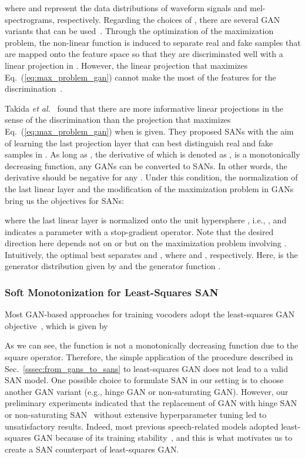 \documentclass{article}
\def\beqref#1{(\ref{#1})}
\begin{document}
where  and  represent the data distributions of waveform signals and mel-spectrograms, respectively.
Regarding the choices of  , there are several GAN variants that can be used~\cite{goodfellow2014generative,sebastian2016f,arjovsky2017wasserstein}.
Through the optimization of the maximization problem, the non-linear function  is induced to separate real and fake samples that are mapped onto the feature space  so that they are discriminated well with a linear projection in . However, the linear projection  that maximizes Eq.~\beqref{eq:max_problem_gan} cannot make the most of the features for the discrimination~\cite{takida2023san}.

Takida \textit{et al.}~\cite{takida2023san} found that there are more informative linear projections in the sense of the discrimination than the projection  that maximizes Eq.~\beqref{eq:max_problem_gan} when  is given. They proposed SANs with the aim of learning the last projection layer that can best distinguish real and fake samples in . As long as , the derivative of which is denoted as , is a monotonically decreasing function, any GANs can be converted to SANs. In other words, the derivative  should be negative for any . Under this condition, the normalization of the last linear layer and the modification of the maximization problem in GANs bring us the objectives for SANs:

where the last linear layer is normalized onto the unit hypersphere , i.e., , and  indicates a parameter with a stop-gradient operator.
Note that the desired direction here depends not on  or  but on the maximization problem involving . Intuitively, the optimal  best separates  and , where  and , respectively. Here,  is the generator distribution given by  and the generator function .

\subsubsection{Soft Monotonization for Least-Squares SAN}
\label{sssec:least_square_san}

Most GAN-based approaches for training vocoders adopt the least-squares GAN objective~\cite{mao2017least}, which is given by

As we can see, the function  is not a monotonically decreasing function due to the square operator. Therefore, the simple application of the procedure described in Sec.~\ref{sssec:from_gans_to_sans} to least-squares GAN does not lead to a valid SAN model. One possible choice to formulate SAN in our setting is to choose another GAN variant (e.g., hinge GAN or non-saturating GAN). However, our preliminary experiments indicated that the replacement of GAN with hinge SAN or non-saturating SAN~\cite{takida2023san} without extensive hyperparameter tuning led to unsatisfactory results. Indeed, most previous speech-related models adopted least-squares GAN because of its training stability~\cite{bollepalli2017generative,pascual17segan,yamamoto2020parallel,kong2020hifigan}, and this is what motivates us to create a SAN counterpart of least-squares GAN.
\end{document}
